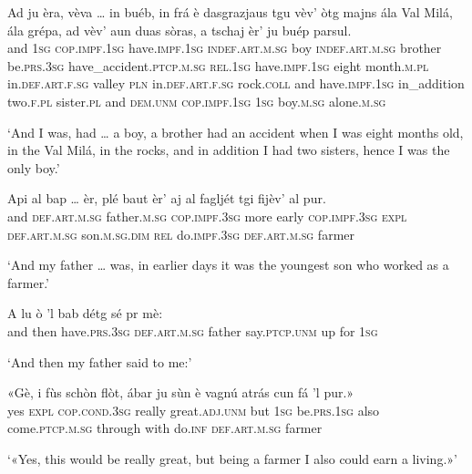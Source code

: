 \begin{linenumbers}
\gll    Ad ju èra, vèva … in buéb, in frá è dasgrazjaus tgu vèv’ òtg majns ála Val Milá, ála grépa, ad vèv' aun duas sòras, a tschaj  èr' ju buép parsul. \\
and \textsc{1sg} \textsc{cop.impf.1sg} have.\textsc{impf.1sg} {} \textsc{indef.art.m.sg} boy \textsc{indef.art.m.sg} brother  be.\textsc{prs.3sg} have\_accident.\textsc{ptcp.m.sg} \textsc{rel.1sg} have.\textsc{impf.1sg} eight month.\textsc{m.pl} in.\textsc{def.art.f.sg} valley \textsc{pln} in.\textsc{def.art.f.sg} rock.\textsc{coll} and have.\textsc{impf.1sg} in\_addition two.\textsc{f.pl} sister.\textsc{pl} and \textsc{dem.unm}  \textsc{cop.impf.1sg} \textsc{1sg} boy.\textsc{m.sg} alone.\textsc{m.sg}\\
\end{linenumbers}
\medskip
\glt `And I was, had … a boy, a brother had an accident when I was eight months old, in the Val Milá, in the rocks, and in addition I had two sisters, hence I was the only boy.'
\medskip

\begin{linenumbers}
\gll  Api al bap … èr, plé baut èr’ aj al fagljét tgi fijèv’ al pur. \\
and \textsc{def.art.m.sg} father.\textsc{m.sg} {}  \textsc{cop.impf.3sg} more early \textsc{cop.impf.3sg} \textsc{expl} \textsc{def.art.m.sg}  son.\textsc{m.sg.dim} \textsc{rel} do.\textsc{impf.3sg} \textsc{def.art.m.sg} farmer \\
\end{linenumbers}
\medskip
\glt `And my father … was, in earlier days it was the youngest son who worked as a farmer.'
\medskip


\begin{linenumbers}
\gll   A lu ò ’l bab détg sé pr mè: \\
and then have.\textsc{prs.3sg} \textsc{def.art.m.sg} father say.\textsc{ptcp.unm} up for \textsc{1sg}\\
\end{linenumbers}
\medskip
\glt `And then my father said to me:'
\medskip

\begin{linenumbers}
\gll   «Gè, i fùs schòn flòt, ábar ju sùn è vagnú\footnotemark{} atrás cun fá 'l pur.» \\
yes \textsc{expl} \textsc{cop.cond.3sg} really great.\textsc{adj.unm} but \textsc{1sg}  be.\textsc{prs.1sg} also  come.\textsc{ptcp.m.sg} through with  do.\textsc{inf} \textsc{def.art.m.sg} farmer\\
\end{linenumbers}
\medskip
\glt `«Yes, this would be really great, but being a farmer I also could earn a living.»'
\medskip

